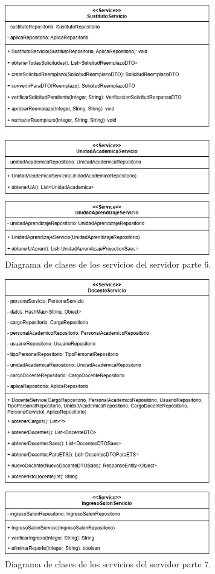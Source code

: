 \begin{figure}[htbp!]
	\begin{center}
		\includegraphics[width=0.8\textwidth]{Clases/Servicio6.png}
		\caption{Diagrama de clases de los servicios del servidor parte 6.}
		\label{fig:DS6}
	\end{center}
\end{figure}

\begin{figure}[htbp!]
	\begin{center}
		\includegraphics[width=0.8\textwidth]{Clases/Servicio7.png}
		\caption{Diagrama de clases de los servicios del servidor parte 7.}
		\label{fig:DS7}
	\end{center}
\end{figure}

